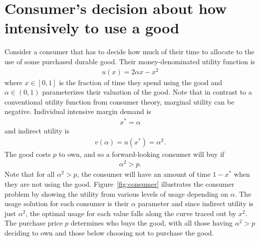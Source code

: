 \documentclass[11pt]{article}
\begin{document}
\section{Consumer's decision about how intensively to use a good} 
Consider a consumer that has to decide how much of their time to allocate to the use of some purchased durable good. 
Their money-denominated utility function is
\begin{align}
u(x) = 2 \alpha x - x^2  
\end{align} 
where $x \in [0,1]$ is the fraction of time they spend using the good and $\alpha \in (0,1)$ parameterizes their valuation of the good. 
Note that in contrast to a conventional utility function from consumer theory, marginal utility can be negative.
Individual intensive margin demand is  
\begin{align}
x^* = \alpha  
\end{align} 
and indirect utility is 
\begin{align}
v(\alpha) = u(x^*) = \alpha^2.  
\end{align} 
The good costs $p$ to own, and so a forward-looking consumer will buy if 
\begin{align} 
\alpha^2 > p. 
\end{align} 
Note that for all $\alpha^2 > p$, the consumer will have an amount of time $1 - x^*$ when they are not using the good.
Figure~\ref{fig:consumer} illustrates the consumer problem by showing the utility from various levels of usage depending on $\alpha$.
The usage solution for each consumer is their $\alpha$ parameter and since indirect utility is just $\alpha^2$, the optimal usage for each value falls along the curve traced out by $x^2$.
The purchase price $p$ determines who buys the good, with all those having $\alpha^2 > p$ deciding to own and those below choosing not to purchase the good. 

\pgfmathsetmacro{\xstarOne}{\alphaOne}%
%

\pgfmathsetmacro{\xstarTwo}{\alphaTwo}%
%

\pgfmathsetmacro{\xstarThree}{\alphaThree}%
%
\end{document}
